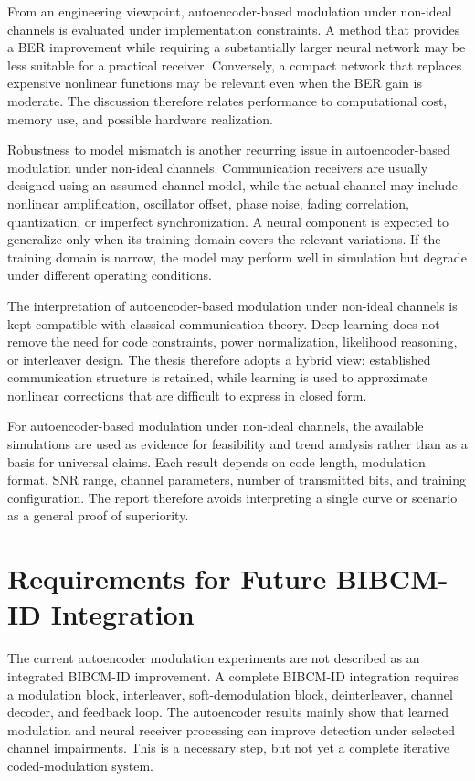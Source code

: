 From an engineering viewpoint, autoencoder-based modulation under non-ideal channels is evaluated under implementation constraints. A method that provides a BER improvement while requiring a substantially larger neural network may be less suitable for a practical receiver. Conversely, a compact network that replaces expensive nonlinear functions may be relevant even when the BER gain is moderate. The discussion therefore relates performance to computational cost, memory use, and possible hardware realization.

Robustness to model mismatch is another recurring issue in autoencoder-based modulation under non-ideal channels. Communication receivers are usually designed using an assumed channel model, while the actual channel may include nonlinear amplification, oscillator offset, phase noise, fading correlation, quantization, or imperfect synchronization. A neural component is expected to generalize only when its training domain covers the relevant variations. If the training domain is narrow, the model may perform well in simulation but degrade under different operating conditions.

The interpretation of autoencoder-based modulation under non-ideal channels is kept compatible with classical communication theory. Deep learning does not remove the need for code constraints, power normalization, likelihood reasoning, or interleaver design. The thesis therefore adopts a hybrid view: established communication structure is retained, while learning is used to approximate nonlinear corrections that are difficult to express in closed form.

For autoencoder-based modulation under non-ideal channels, the available simulations are used as evidence for feasibility and trend analysis rather than as a basis for universal claims. Each result depends on code length, modulation format, SNR range, channel parameters, number of transmitted bits, and training configuration. The report therefore avoids interpreting a single curve or scenario as a general proof of superiority.

\section{Requirements for Future BIBCM-ID Integration}
The current autoencoder modulation experiments are not described as an integrated BIBCM-ID improvement. A complete BIBCM-ID integration requires a modulation block, interleaver, soft-demodulation block, deinterleaver, channel decoder, and feedback loop. The autoencoder results mainly show that learned modulation and neural receiver processing can improve detection under selected channel impairments. This is a necessary step, but not yet a complete iterative coded-modulation system.

